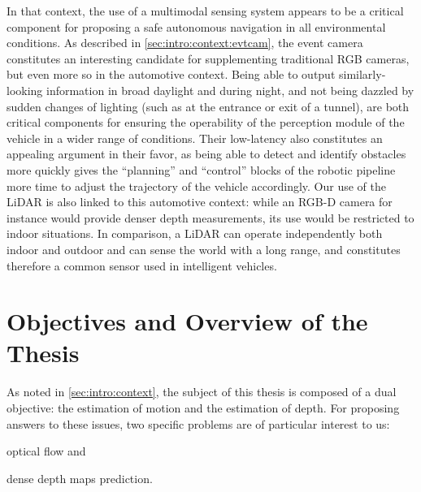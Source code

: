 In that context, the use of a multimodal sensing system appears to be a critical component for proposing a safe autonomous navigation in all environmental conditions. As described in \cref{sec:intro:context:evtcam}, the event camera constitutes an interesting candidate for supplementing traditional RGB cameras, but even more so in the automotive context. Being able to output similarly-looking information in broad daylight and during night, and not being dazzled by sudden changes of lighting (such as at the entrance or exit of a tunnel), are both critical components for ensuring the operability of the perception module of the vehicle in a wider range of conditions. Their low-latency also constitutes an appealing argument in their favor, as being able to detect and identify obstacles more quickly gives the ``planning'' and ``control'' blocks of the robotic pipeline more time to adjust the trajectory of the vehicle accordingly. Our use of the LiDAR is also linked to this automotive context: while an RGB-D camera for instance would provide denser depth measurements, its use would be restricted to indoor situations. In comparison, a LiDAR can operate independently both indoor and outdoor and can sense the world with a long range, and constitutes therefore a common sensor used in intelligent vehicles.


\section{Objectives and Overview of the Thesis}
As noted in \cref{sec:intro:context}, the subject of this thesis is composed of a dual objective: the estimation of motion and the estimation of depth. For proposing answers to these issues, two specific problems are of particular interest to us:
\begin{enumerate*}[label=\textbf{(\arabic*)}]
  \item optical flow and
  \item dense depth maps prediction.
\end{enumerate*}

